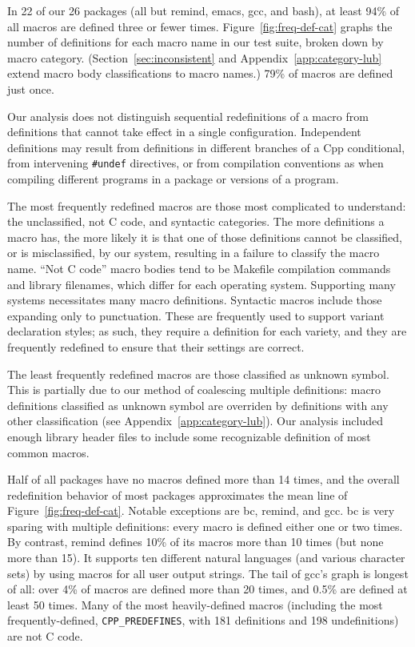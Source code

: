 \documentclass[10pt]{article}
\newcommand{\pkg}[1]{\textsf{#1}}
\begin{document}
In 22 of our 26 packages (all but \pkg{remind}, \pkg{emacs}, \pkg{gcc}, and
\pkg{bash}), at least 94\% of all macros are defined three or fewer times.
Figure~\ref{fig:freq-def-cat} graphs the number of definitions for each
macro name in our test suite, broken down by macro category.
(Section~\ref{sec:inconsistent} and Appendix~\ref{app:category-lub} extend
macro body classifications to macro names.)  79\% of macros are defined just once.

Our analysis does not distinguish sequential redefinitions of a macro from definitions that cannot take effect in a single configuration.
Independent definitions may result from definitions in different branches
of a Cpp conditional, from intervening {\tt \#undef} directives, or from
compilation conventions as when compiling different programs in a package
or versions of a program.


The most frequently redefined macros are those most complicated to
understand: the unclassified, not C code, and syntactic categories.  The
more definitions a macro has, the more likely it is that one of those
definitions cannot be classified, or is misclassified, by our system,
resulting in a failure to classify the macro name.  ``Not C code'' macro
bodies tend to be Makefile compilation commands and library filenames,
which differ for each operating system.  Supporting many systems
necessitates many macro definitions.  Syntactic macros include those
expanding only to punctuation.  These are frequently used to support
variant declaration styles; as such, they require a definition for each
variety, and they are frequently redefined to ensure that their settings
are correct.

The least frequently redefined macros are those classified as unknown
symbol.  This is partially due to our method of coalescing multiple
definitions:  macro definitions classified as unknown symbol are overriden
by definitions with any other classification (see
Appendix~\ref{app:category-lub}).  Our
analysis included enough library header files to include some
recognizable definition of most common macros.

Half of all packages have no macros defined more than 14 times, and the
overall redefinition behavior of most packages approximates the mean line
of Figure~\ref{fig:freq-def-cat}.  Notable exceptions are \pkg{bc},
\pkg{remind}, and \pkg{gcc}.  \pkg{bc} is very sparing with multiple
definitions: every macro is defined either one or two times.  By contrast, 
\pkg{remind} defines 10\% of its macros more than 10 times (but none more
than 15).  It supports ten different natural languages (and various character
sets) by using macros for all user output strings.  The tail of \pkg{gcc}'s
graph is longest of all: over 4\% of macros are defined more than 20 times,
and 0.5\% are defined at least 50 times.  Many of the most heavily-defined
macros (including the most frequently-defined, \verb|CPP_PREDEFINES|, with
181 definitions and 198 undefinitions) are not C code.
\end{document}
